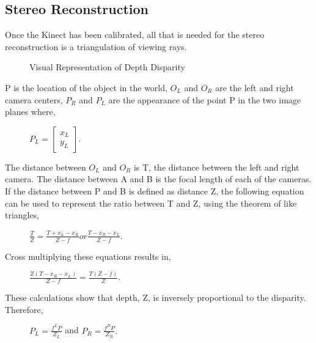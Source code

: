 \documentclass[pdftex,10.5pt]{report}
\begin{document}
\subsection{Stereo Reconstruction}
Once the Kinect has been calibrated, all that is needed for the stereo reconstruction is a triangulation of viewing rays.

\begin{figure}[H]
\centering
\caption{Visual Representation of Depth Disparity}
\end{figure}

P is the location of the object in the world, $O_{L}$ and $O_{R}$ are the left and right camera centers, $P_{R}$ and $P_{L}$ are the appearance of the point P in the two image planes where, 
\begin{figure}[H]
\centering
	 $P_{L}= 
	\begin{bmatrix}
		x_{L} \\
		y_{L} 
	\end{bmatrix}$.
\end{figure}
The distance between $O_{L}$ and $O_{R}$ is T, the distance between the left and right camera. The distance between A and B is the focal length of each of the cameras. If the distance between P and B is defined as distance Z, the following equation  can be used to represent the ratio between T and Z, using the theorem of like triangles,
\begin{figure}[H]
\centering
	$\frac{T}{Z}=\frac{T+x_{L}-x_{R}}{Z-f} or \frac{T-{x_{R}-x_{L}}}{Z-f}$. 
\end{figure} 
Cross multiplying these equations results in,
\begin{figure}[H]
\centering
	$\frac{Z(T-x_{R}-x_{L})}{Z-f} = \frac{T(Z-f)}{Z}$. 
\end{figure}
These calculations show that depth, Z, is inversely proportional to the disparity. Therefore,  
\begin{figure}[H]
\centering
	$P_{L}= \frac{f^{L}P}{Z_{L}} $ and $P_{R}= \frac{f^{R}P}{Z_{R}}.$
\end{figure} 
\end{document}
